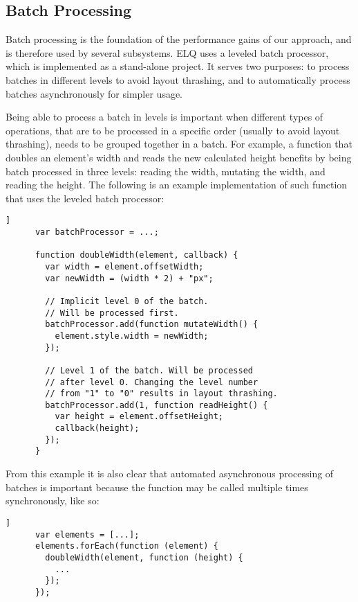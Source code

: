 \documentclass{acm_proc_article-sp}
\newcommand{\elq}{ELQ}
\begin{document}
  \subsection{Batch Processing}\label{sec:imp_batch_processor}
    Batch processing is the foundation of the performance gains of our approach, and is therefore used by several subsystems.
    \elq{} uses a leveled batch processor, which is implemented as a stand-alone project.
    It serves two purposes: to process batches in different levels to avoid layout thrashing, and to automatically process batches asynchronously for simpler usage.

    Being able to process a batch in levels is important when different types of operations, that are to be processed in a specific order (usually to avoid layout thrashing), needs to be grouped together in a batch.
    For example, a function that doubles an element's width and reads the new calculated height benefits by being batch processed in three levels: reading the width, mutating the width, and reading the height.
    The following is an example implementation of such function that uses the leveled batch processor:

    \begin{lstlisting}[gobble=6,label={},caption={},captionpos=b]]
      var batchProcessor = ...;

      function doubleWidth(element, callback) {
        var width = element.offsetWidth;
        var newWidth = (width * 2) + "px";

        // Implicit level 0 of the batch. 
        // Will be processed first.
        batchProcessor.add(function mutateWidth() {
          element.style.width = newWidth;
        });

        // Level 1 of the batch. Will be processed 
        // after level 0. Changing the level number 
        // from "1" to "0" results in layout thrashing.
        batchProcessor.add(1, function readHeight() {
          var height = element.offsetHeight;
          callback(height);
        });
      }
    \end{lstlisting}

    From this example it is also clear that automated asynchronous processing of batches is important because the function may be called multiple times synchronously, like so:

    \begin{lstlisting}[gobble=6,label={},caption={},captionpos=b]]
      var elements = [...];
      elements.forEach(function (element) {
        doubleWidth(element, function (height) {
          ...
        });
      });
    \end{lstlisting}
\end{document}
